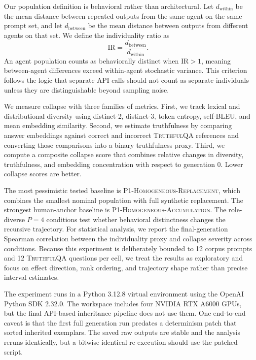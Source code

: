 Our population definition is behavioral rather than architectural. Let $d_{\mathrm{within}}$ be the mean distance between repeated outputs from the same agent on the same prompt set, and let $d_{\mathrm{between}}$ be the mean distance between outputs from different agents on that set. We define the individuality ratio as
\[
\text{IR} = \frac{d_{\mathrm{between}}}{d_{\mathrm{within}}}.
\]
An agent population counts as behaviorally distinct when $\text{IR} > 1$, meaning between-agent differences exceed within-agent stochastic variance. This criterion follows the logic that separate API calls should not count as separate individuals unless they are distinguishable beyond sampling noise.

We measure collapse with three families of metrics. First, we track lexical and distributional diversity using distinct-2, distinct-3, token entropy, self-BLEU, and mean embedding similarity. Second, we estimate truthfulness by comparing answer embeddings against correct and incorrect \textsc{TruthfulQA} references and converting those comparisons into a binary truthfulness proxy. Third, we compute a composite collapse score that combines relative changes in diversity, truthfulness, and embedding concentration with respect to generation 0. Lower collapse scores are better.

The most pessimistic tested baseline is \textsc{P1-Homogeneous-Replacement}, which combines the smallest nominal population with full synthetic replacement. The strongest human-anchor baseline is \textsc{P1-Homogeneous-Accumulation}. The role-diverse $P{=}4$ conditions test whether behavioral distinctness changes the recursive trajectory. For statistical analysis, we report the final-generation Spearman correlation between the individuality proxy and collapse severity across conditions. Because this experiment is deliberately bounded to 12 corpus prompts and 12 \textsc{TruthfulQA} questions per cell, we treat the results as exploratory and focus on effect direction, rank ordering, and trajectory shape rather than precise interval estimates.

The experiment runs in a Python 3.12.8 virtual environment using the OpenAI Python SDK 2.32.0. The workspace includes four NVIDIA RTX A6000 GPUs, but the final API-based inheritance pipeline does not use them. One end-to-end caveat is that the first full generation run predates a determinism patch that sorted inherited exemplars. The saved raw outputs are stable and the analysis reruns identically, but a bitwise-identical re-execution should use the patched script.
